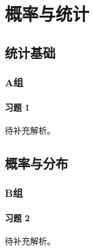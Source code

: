 \chapter{概率与统计}

\section{统计基础}

\subsection*{A组}

\subsubsection*{习题 1}
\begin{solution}
	待补充解析。
\end{solution}

\section{概率与分布}

\subsection*{B组}

\subsubsection*{习题 2}
\begin{solution}
	待补充解析。
\end{solution}
